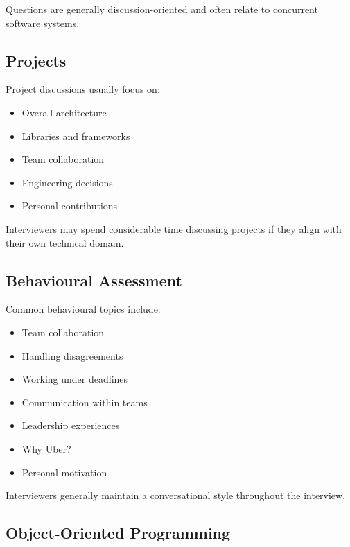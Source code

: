 \documentclass[11pt,a4paper]{article}
\begin{document}
Questions are generally discussion-oriented and often relate to concurrent software systems.


\subsection{Projects}

Project discussions usually focus on:

\begin{itemize}
	\item Overall architecture
	\item Libraries and frameworks
	\item Team collaboration
	\item Engineering decisions
	\item Personal contributions
\end{itemize}

Interviewers may spend considerable time discussing projects if they align with their own technical domain.


\subsection{Behavioural Assessment}

Common behavioural topics include:

\begin{itemize}
	\item Team collaboration
	\item Handling disagreements
	\item Working under deadlines
	\item Communication within teams
	\item Leadership experiences
	\item Why Uber?
	\item Personal motivation
\end{itemize}

Interviewers generally maintain a conversational style throughout the interview.


\subsection{Object-Oriented Programming}
\end{document}
